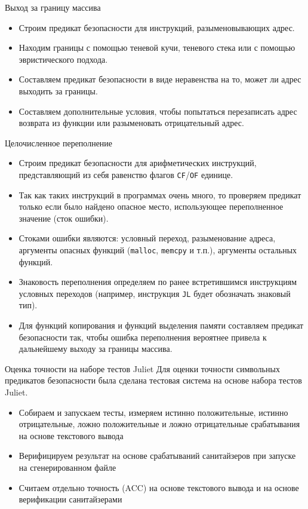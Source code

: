 \documentclass[10pt]{beamer}
\begin{document}
\begin{frame}{Выход за границу массива}
\begin{itemize}
    \item Строим предикат безопасности для инструкций, разыменовывающих адрес.
    \item Находим границы с помощью теневой кучи, теневого стека или с помощью
        эвристического подхода.
    \item Составляем предикат безопасности в виде неравенства на то, может ли
        адрес выходить за границы.
    \item Составляем дополнительные условия, чтобы попытаться перезаписать адрес
        возврата из функции или разыменовать отрицательный адрес.
\end{itemize}
\end{frame}

\begin{frame}{Целочисленное переполнение}
\begin{itemize}
    \item Строим предикат безопасности для арифметических инструкций,
        представляющий из себя равенство флагов \texttt{CF}/\texttt{OF} единице.
    \item Так как таких инструкций в программах очень много, то проверяем предикат
        только если было найдено опасное место, использующее
        переполненное значение (сток ошибки).
    \item Стоками ошибки являются: условный переход, разыменование
        адреса, аргументы опасных функций (\texttt{malloc}, \texttt{memcpy} и
        т.п.),
        аргументы остальных функций.
    \item Знаковость переполнения определяем по ранее встретившимся инструкциям
        условных переходов (например, инструкция \texttt{JL} будет обозначать
        знаковый тип).
    \item Для функций копирования и функций выделения памяти составляем предикат
        безопасности так, чтобы ошибка переполнения вероятнее привела к
        дальнейшему выходу за границы массива.
\end{itemize}
\end{frame}

\begin{frame}{Оценка точности на наборе тестов Juliet}
Для оценки точности символьных предикатов безопасности была сделана тестовая система на
основе набора тестов Juliet.
\begin{itemize}
    \item Собираем и запускаем тесты, измеряем истинно положительные, истинно
        отрицательные, ложно положительные и ложно отрицательные срабатывания на
        основе текстового вывода
    \item Верифицируем результат на основе срабатываний санитайзеров при запуске
        на сгенерированном файле
    \item Считаем отдельно точность (ACC) на основе текстового вывода и на
        основе верификации санитайзерами
\end{itemize}
\end{frame}
\end{document}
